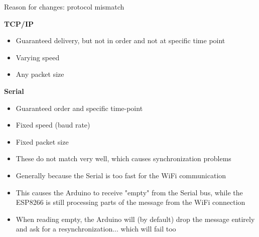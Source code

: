\documentclass[12pt]{beamer}
\begin{document}
\begin{frame}{Reason for changes: protocol mismatch}
\begin{minipage}[t]{.45\linewidth}%
  { \large\textbf{TCP/IP}}\\
  \begin{itemize}
    
\item<2->[$\bullet$] Guaranteed delivery, but not in order and not at specific time point
\item<3->[$\bullet$] Varying speed
\item<4->[$\bullet$] Any packet size
\end{itemize}
\end{minipage}\hspace{1cm}\begin{minipage}[t]{.45\linewidth}%
  { \large\textbf{Serial}}\\
  \begin{itemize}
\item<2->[$\bullet$] Guaranteed order and specific time-point
\item<3->[$\bullet$] Fixed speed (baud rate) 
\item<4->[$\bullet$] Fixed packet size
\end{itemize}
\vspace{.5cm}
\end{minipage}
\begin{itemize}
\item<5->[$\Rightarrow$] These do not match very well, which causes synchronization problems
\item<6->[$\Rightarrow$] Generally because the Serial is too fast for the WiFi communication
\item<7->[$\Rightarrow$] This causes the Arduino to receive "empty" from the Serial bus, while the ESP8266 is still processing parts of the message from the WiFi connection
\item<8->[$\Rightarrow$] When reading empty, the Arduino will (by default) drop the message entirely and ask for a resynchronization... which will fail too
  \end{itemize}
\end{frame}
\end{document}
